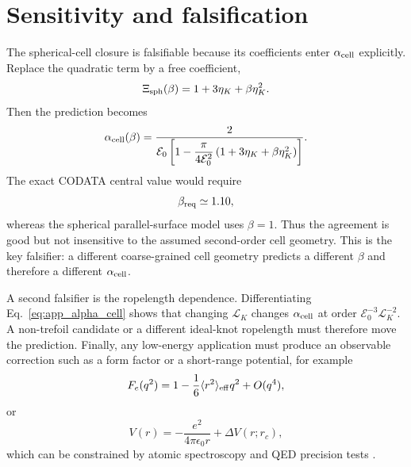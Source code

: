 \documentclass[aps,pra,preprint,longbibliography,nofootinbib]{revtex4-2}
\begin{document}
\section{Sensitivity and falsification}
\label{app:sensitivity}

The spherical-cell closure is falsifiable because its coefficients enter
$\alpha_{\rm cell}$ explicitly.  Replace the quadratic term by a free
coefficient,
\begin{equation}
  \Xi_{\rm sph}(\beta)
  =1+3\eta_K+\beta\eta_K^2 .
  \label{eq:app_beta_sensitivity}
\end{equation}
Then the prediction becomes
\begin{equation}
  \alpha_{\rm cell}(\beta)
  =\frac{2}{\mathcal E_0\left[1-
  \dfrac{\pi}{4\mathcal E_0^2}\left(1+3\eta_K+\beta\eta_K^2\right)\right]} .
  \label{eq:app_alpha_beta}
\end{equation}
The exact CODATA central value would require
\begin{equation}
  \beta_{\rm req}\simeq1.10,
  \label{eq:app_beta_req}
\end{equation}
whereas the spherical parallel-surface model uses $\beta=1$.  Thus the
agreement is good but not insensitive to the assumed second-order
cell geometry.  This is the key falsifier: a different coarse-grained cell
geometry predicts a different $\beta$ and therefore a different
$\alpha_{\rm cell}$.

A second falsifier is the ropelength dependence.  Differentiating
Eq.~\eqref{eq:app_alpha_cell} shows that changing $\mathcal L_K$ changes
$\alpha_{\rm cell}$ at order $\mathcal E_0^{-3}\mathcal L_K^{-2}$.  A
non-trefoil candidate or a different ideal-knot ropelength must therefore
move the prediction.  Finally, any low-energy application must produce an
observable correction such as a form factor or a short-range potential,
for example
\begin{equation}
  F_e(q^2)=1-\frac{1}{6}\langle r^2\rangle_{\rm eff}q^2+O(q^4),
  \label{eq:app_form_factor}
\end{equation}
or
\begin{equation}
  V(r)=-\frac{e^2}{4\pi\epsilon_0 r}+\Delta V(r;r_c),
  \label{eq:app_potential_correction}
\end{equation}
which can be constrained by atomic spectroscopy and QED precision tests
\cite{Bethe1947,Karshenboim2005,PDG2022}.
\end{document}
